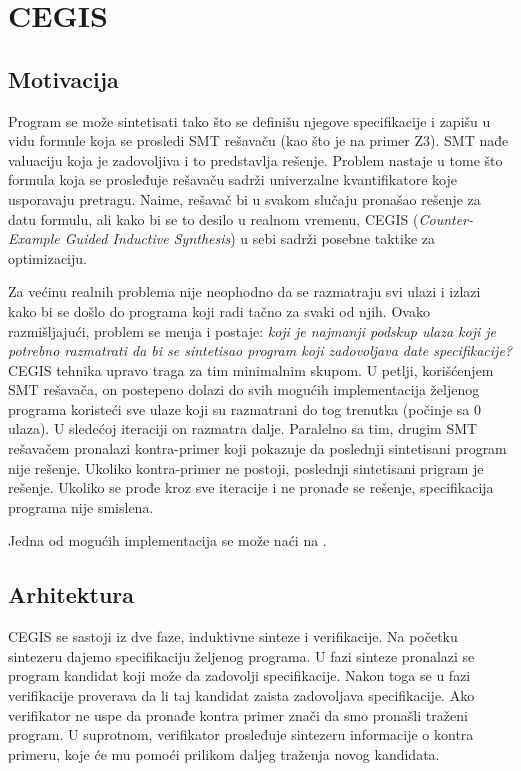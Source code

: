 \section{CEGIS}
\label{sec:cegis}

\subsection{Motivacija}
\label{subsec:Motivacija}

Program se može sintetisati tako što se definišu njegove specifikacije i zapišu u vidu formule koja se prosledi SMT rešavaču (kao što je na primer Z3). SMT nađe valuaciju koja je zadovoljiva i to predstavlja rešenje. Problem nastaje u tome što formula koja se prosleđuje rešavaču sadrži univerzalne kvantifikatore koje usporavaju pretragu. Naime, rešavač bi u svakom slučaju pronašao rešenje za datu formulu, ali kako bi se to desilo u realnom vremenu, CEGIS (\emph{Counter-Example Guided Inductive Synthesis}) u sebi sadrži posebne taktike za optimizaciju.

Za većinu realnih problema nije neophodno da se razmatraju svi ulazi i izlazi kako bi se došlo do programa koji radi tačno za svaki od njih. Ovako razmišljajući, problem se menja i postaje: \emph{koji je najmanji podskup ulaza koji je potrebno razmatrati da bi se sintetisao program koji zadovoljava date specifikacije?}
CEGIS tehnika upravo traga za tim minimalnim skupom. U petlji, korišćenjem SMT rešavača, on postepeno dolazi do svih mogućih implementacija željenog programa koristeći sve ulaze koji su razmatrani do tog trenutka (počinje sa 0 ulaza). U sledećoj iteraciji on razmatra dalje. Paralelno sa tim, drugim SMT rešavačem pronalazi kontra-primer koji pokazuje da poslednji sintetisani program nije rešenje. Ukoliko kontra-primer ne postoji, poslednji sintetisani prigram je rešenje. Ukoliko se prođe kroz sve iteracije i ne pronađe se rešenje, specifikacija programa nije smislena.

Jedna od mogućih implementacija se može naći na \cite{CEGISimpl}.

\subsection{Arhitektura}
\label{subsec:Arhitektura}

CEGIS se sastoji iz dve faze, induktivne sinteze i verifikacije. Na početku sintezeru dajemo specifikaciju željenog programa. U fazi sinteze pronalazi se program kandidat koji može da zadovolji specifikacije. Nakon toga se u fazi verifikacije proverava da li taj kandidat zaista zadovoljava specifikacije. Ako verifikator ne uspe da pronađe kontra primer znači da smo pronašli traženi program. U suprotnom, verifikator prosleđuje sintezeru informacije o kontra primeru, koje će mu pomoći prilikom daljeg traženja novog kandidata. 

